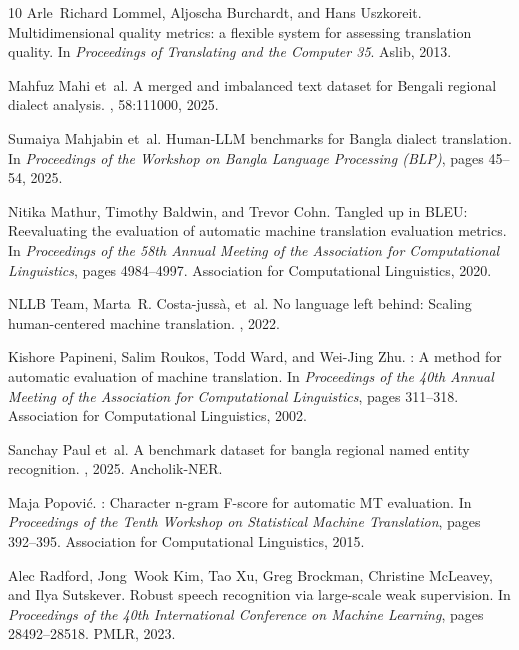 \documentclass[12pt,a4paper]{article}
\begin{document}
\begin{thebibliography}{10}
Arle~Richard Lommel, Aljoscha Burchardt, and Hans Uszkoreit.
\newblock Multidimensional quality metrics: a flexible system for assessing
  translation quality.
\newblock In {\em Proceedings of Translating and the Computer 35}. Aslib, 2013.

Mahfuz Mahi et~al.
\newblock A merged and imbalanced text dataset for {B}engali regional dialect
  analysis.
, 58:111000, 2025.

Sumaiya Mahjabin et~al.
\newblock Human-{LLM} benchmarks for {B}angla dialect translation.
\newblock In {\em Proceedings of the Workshop on Bangla Language Processing
  (BLP)}, pages 45--54, 2025.

Nitika Mathur, Timothy Baldwin, and Trevor Cohn.
\newblock Tangled up in {BLEU}: Reevaluating the evaluation of automatic
  machine translation evaluation metrics.
\newblock In {\em Proceedings of the 58th Annual Meeting of the Association for
  Computational Linguistics}, pages 4984--4997. Association for Computational
  Linguistics, 2020.

{NLLB Team}, Marta~R. Costa-juss{\`a}, et~al.
\newblock No language left behind: Scaling human-centered machine translation.
, 2022.

Kishore Papineni, Salim Roukos, Todd Ward, and Wei-Jing Zhu.
: A method for automatic evaluation of machine translation.
\newblock In {\em Proceedings of the 40th Annual Meeting of the Association for
  Computational Linguistics}, pages 311--318. Association for Computational
  Linguistics, 2002.

Sanchay Paul et~al.
\newblock A benchmark dataset for bangla regional named entity recognition.
, 2025.
\newblock Ancholik-NER.

Maja Popovi{\'c}.
: Character n-gram {F}-score for automatic {MT} evaluation.
\newblock In {\em Proceedings of the Tenth Workshop on Statistical Machine
  Translation}, pages 392--395. Association for Computational Linguistics,
  2015.

Alec Radford, Jong~Wook Kim, Tao Xu, Greg Brockman, Christine McLeavey, and
  Ilya Sutskever.
\newblock Robust speech recognition via large-scale weak supervision.
\newblock In {\em Proceedings of the 40th International Conference on Machine
  Learning}, pages 28492--28518. PMLR, 2023.


\end{thebibliography}
\end{document}
